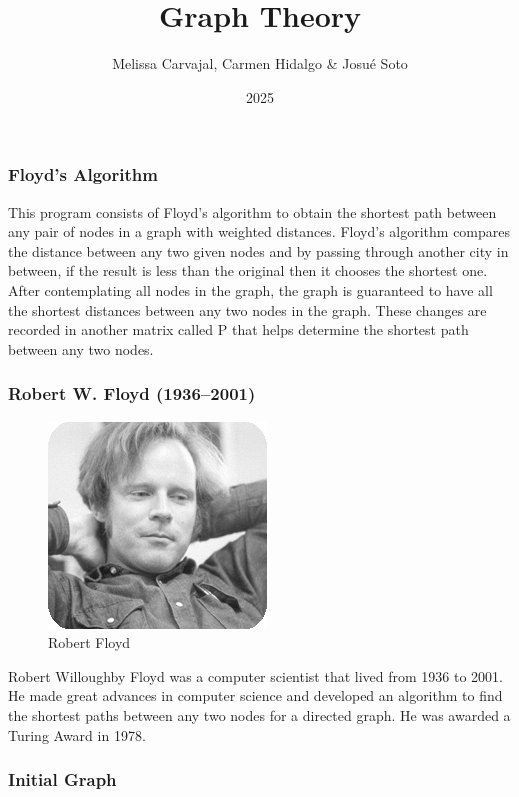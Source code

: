\documentclass{beamer}
\title{Graph Theory}
\author{Melissa Carvajal, Carmen Hidalgo & Josu\'e Soto}
\institute{Investigaci\'on de Operaciones}
\date{2025}
\begin{document}
\maketitle

\begin{frame}
\frametitle{Floyd's Algorithm}
This program consists of Floyd's algorithm to obtain the shortest path between any pair of nodes in a graph with weighted distances.
Floyd's algorithm compares the distance between any two given nodes and by passing through another city in between, if the result is less than the original then it chooses the shortest one. After contemplating all nodes in the graph, the graph is guaranteed to have all the shortest distances between any two nodes in the graph. These changes are recorded in another matrix called P that helps determine the shortest path between any two nodes.
\end{frame}
\begin{frame}
\frametitle{Robert W. Floyd (1936–2001)}
\begin{figure}
\centering
\includegraphics[width=0.25	extwidth]{floyd.jpg}
\caption{\label{fig:floyd}Robert Floyd}
\end{figure}
Robert Willoughby Floyd was a computer scientist that lived from 1936 to 2001. He made great advances in computer science and developed an algorithm to find the shortest paths between any two nodes for a directed graph. He was awarded a Turing Award in 1978.
\end{frame}
\begin{frame}
\frametitle{Initial Graph}
\begin{center}
\end{center}
\end{frame}
\end{document}
